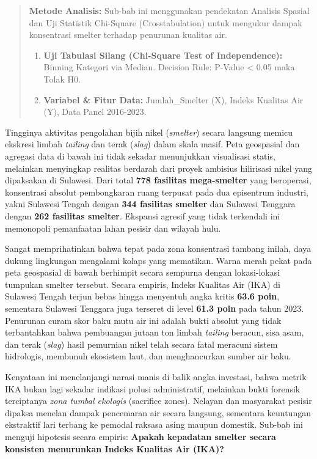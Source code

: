 \documentclass[
]{article}
\providecommand{\tightlist}{%
  \setlength{\itemsep}{0pt}\setlength{\parskip}{0pt}}
\begin{document}
\begin{quote}
\textbf{Metode Analisis:} Sub-bab ini menggunakan pendekatan Analisis
Spasial dan Uji Statistik Chi-Square (Crosstabulation) untuk mengukur
dampak konsentrasi smelter terhadap penurunan kualitas air.

\begin{enumerate}
\def\labelenumi{\arabic{enumi}.}
\tightlist
\item
  \textbf{Uji Tabulasi Silang (Chi-Square Test of Independence):}
  Binning Kategori via Median. Decision Rule: P-Value \textless{} 0.05
  maka Tolak H0.
\item
  \textbf{Variabel \& Fitur Data:} Jumlah\_Smelter (X), Indeks Kualitas
  Air (Y), Data Panel 2016-2023.
\end{enumerate}
\end{quote}

Tingginya aktivitas pengolahan bijih nikel (\emph{smelter}) secara
langsung memicu ekskresi limbah \emph{tailing} dan terak (\emph{slag})
dalam skala masif. Peta geospasial dan agregasi data di bawah ini tidak
sekadar menunjukkan visualisasi statis, melainkan menyingkap realitas
berdarah dari proyek ambisius hilirisasi nikel yang dipaksakan di
Sulawesi. Dari total \textbf{778 fasilitas mega-smelter} yang
beroperasi, konsentrasi absolut pembongkaran ruang terpusat pada dua
episentrum industri, yakni Sulawesi Tengah dengan \textbf{344 fasilitas
smelter} dan Sulawesi Tenggara dengan \textbf{262 fasilitas smelter}.
Ekspansi agresif yang tidak terkendali ini memonopoli pemanfaatan lahan
pesisir dan wilayah hulu.

Sangat memprihatinkan bahwa tepat pada zona konsentrasi tambang inilah,
daya dukung lingkungan mengalami kolaps yang mematikan. Warna merah
pekat pada peta geospasial di bawah berhimpit secara sempurna dengan
lokasi-lokasi tumpukan smelter tersebut. Secara empiris, Indeks Kualitas
Air (IKA) di Sulawesi Tengah terjun bebas hingga menyentuh angka kritis
\textbf{63.6 poin}, sementara Sulawesi Tenggara juga terseret di level
\textbf{61.3 poin} pada tahun 2023. Penurunan curam skor baku mutu air
ini adalah bukti absolut yang tidak terbantahkan bahwa pembuangan jutaan
ton limbah \emph{tailing} beracun, sisa asam, dan terak (\emph{slag})
hasil pemurnian nikel telah secara fatal meracuni sistem hidrologis,
membunuh ekosistem laut, dan menghancurkan sumber air baku.

Kenyataan ini menelanjangi narasi manis di balik angka investasi, bahwa
metrik IKA bukan lagi sekadar indikasi polusi administratif, melainkan
bukti forensik terciptanya \emph{zona tumbal ekologis} (sacrifice
zones). Nelayan dan masyarakat pesisir dipaksa menelan dampak pencemaran
air secara langsung, sementara keuntungan ekstraktif lari terbang ke
pemodal raksasa asing maupun domestik. Sub-bab ini menguji hipotesis
secara empiris: \textbf{Apakah kepadatan smelter secara konsisten
menurunkan Indeks Kualitas Air (IKA)?}
\end{document}
